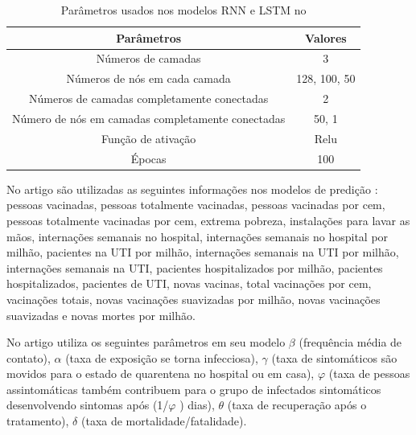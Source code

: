 \begin{table}[h]
    \centering
    \begin{tabular}{|c|c|}
    \hline
         \textbf{Parâmetros} & \textbf{Valores} \\
         \hline
         Números de camadas & 3 \\
         \hline
         Números de nós em cada camada & 128, 100, 50 \\
         \hline 
         Números de camadas completamente conectadas & 2 \\
         \hline
         Número de nós em camadas completamente conectadas & 50, 1 \\
         \hline
         Função de ativação & Relu \\
         \hline
         Épocas & 100 \\
         \hline
    \end{tabular}
    \caption{Parâmetros usados nos modelos RNN e LSTM no \cite{Nikita}}
    \label{tab:my_label1}
\end{table}

No artigo \cite{Alkhammash} são utilizadas as seguintes informações nos modelos de predição : pessoas vacinadas, pessoas totalmente vacinadas, pessoas vacinadas por cem, pessoas totalmente vacinadas por cem, extrema pobreza, instalações para lavar as mãos, internações semanais no hospital, internações semanais no hospital por milhão, pacientes na UTI por milhão, internações semanais na UTI por milhão, internações semanais na UTI, pacientes hospitalizados por milhão, pacientes hospitalizados, pacientes de UTI, novas vacinas, total vacinações por cem, vacinações totais, novas vacinações suavizadas por milhão, novas vacinações suavizadas e novas mortes por milhão.

No artigo \cite{Rakshit} utiliza os seguintes parâmetros em seu modelo $\beta$ (frequência média de contato), $\alpha$ (taxa de exposição se torna infecciosa), $\gamma$ (taxa de sintomáticos são movidos para o estado de quarentena no hospital ou em casa), $\varphi$ (taxa de pessoas assintomáticas também contribuem para o grupo de infectados sintomáticos desenvolvendo sintomas após (1/$\varphi$ ) dias), $\theta$ (taxa de recuperação após o tratamento), $\delta$ (taxa de mortalidade/fatalidade).
